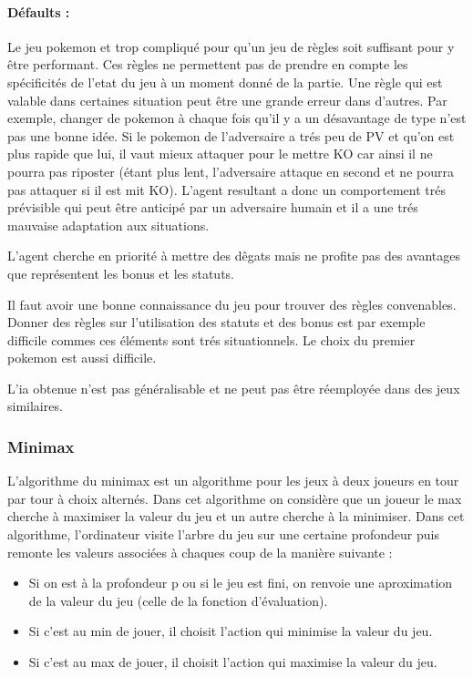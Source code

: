 			\paragraph{Défaults :}
				Le jeu pokemon et trop compliqué pour qu'un jeu de règles soit suffisant pour y être performant. Ces règles ne permettent pas de prendre en compte les 					spécificités de l'etat du jeu à un moment donné de la partie. Une règle qui est valable dans certaines situation peut être une grande erreur dans d'autres. Par 							exemple, changer de pokemon à chaque fois qu'il y a un désavantage de type n'est pas une bonne idée. Si le pokemon de l'adversaire a trés peu de PV et qu'on 					est plus rapide que lui, il vaut mieux attaquer pour le mettre KO car ainsi il ne pourra pas riposter (étant plus lent, l'adversaire attaque en second et ne pourra 						pas attaquer si il est mit KO). L'agent resultant a donc un comportement trés prévisible qui peut être anticipé par un adversaire humain et il a une trés 								mauvaise adaptation aux situations. 

				L'agent cherche en priorité à mettre des dêgats mais ne profite pas des avantages que représentent les bonus et les statuts. 

				Il faut avoir une bonne connaissance du jeu pour trouver des règles convenables. Donner des règles sur l'utilisation des statuts et des bonus est par exemple 							difficile commes ces éléments sont trés situationnels. Le choix du premier pokemon est aussi difficile.

				L'ia obtenue n'est pas généralisable et ne peut pas être réemployée dans des jeux similaires.
		\subsubsection{Minimax}
			L'algorithme du minimax est un algorithme pour les jeux à deux joueurs en tour par tour à choix alternés. Dans cet algorithme on considère que un joueur le max 						cherche à maximiser la valeur du jeu et un autre cherche à la minimiser.
			Dans cet algorithme, l'ordinateur visite l'arbre du jeu sur une certaine profondeur puis remonte les valeurs associées à chaques coup de la manière suivante :
			\begin{itemize}
				\item Si on est à la profondeur p ou si le jeu est fini, on renvoie une aproximation de la valeur du jeu (celle de la fonction d'évaluation).
				\item Si c'est au min de jouer, il choisit l'action qui minimise la valeur du jeu.
				\item Si c'est au max de jouer, il choisit l'action qui maximise la valeur du jeu.
			\end{itemize}

